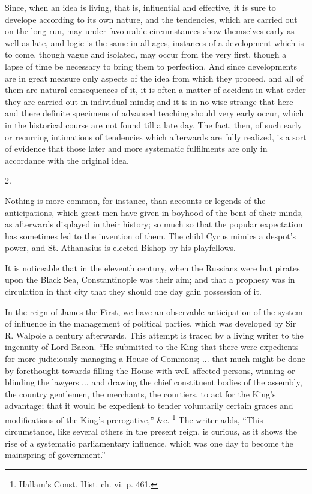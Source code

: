 
Since, when an idea is living, that is, influential
and effective, it is sure to develope according to its
own nature, and the tendencies, which are carried out on
the long run, may under favourable circumstances show
themselves early as well as late, and logic is the same
in all ages, instances of a development which is to come,
though vague and isolated, may occur from the very first,
though a lapse of time be necessary to bring them to
perfection. And since developments are in great measure
only aspects of the idea from which they proceed, and all
of them are natural consequences of it, it is often a
matter of accident in what order they are carried out in
individual minds; and it is in no wise strange that here
and there definite specimens of advanced teaching should
very early occur, which in the historical course are not
found till a late day. The fact, then, of such early or
recurring intimations of tendencies which afterwards are
fully realized, is a sort of evidence that those later
and more systematic fulfilments are only in accordance
with the original idea.

2.

Nothing is more common, for instance, than accounts or
legends of the anticipations, which great men have given
in boyhood of the bent of their minds, as afterwards
displayed in their history; so much so that the popular
expectation has sometimes led to the invention of them.
The child Cyrus mimics a despot's power, and St.
Athanasius is elected Bishop by his playfellows.

It is noticeable that in the eleventh century, when
the Russians were but pirates upon the Black Sea,
Constantinople was their aim; and that a prophesy was in
circulation in that city that they should one day gain
possession of it.

In the reign of James the First, we have an observable
anticipation of the system of influence in the management
of political parties, which was developed by Sir R.
Walpole a century afterwards. This attempt is traced by a
living writer to the ingenuity of Lord Bacon. ``He
submitted to the King that there were expedients for more
judiciously managing a House of Commons; ... that much might
be done by forethought towards filling the House with
well-affected persons, winning or blinding the lawyers
... and drawing the chief constituent bodies of the
assembly, the country gentlemen, the merchants, the
courtiers, to act for the King's advantage; that it would
be expedient to tender voluntarily certain graces and
modifications of the King's prerogative,'' \&c. \footnote{Hallam's Const. Hist. ch. vi.
p. 461.} The
writer adds, ``This circumstance, like several others
in the present reign, is curious, as it shows the rise of
a systematic parliamentary influence, which was one day
to become the mainspring of government.''

